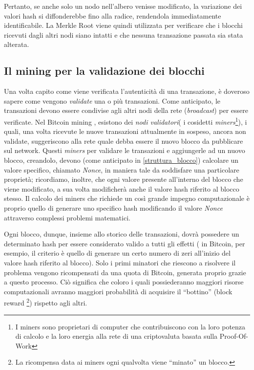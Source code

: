 Pertanto, se anche solo un nodo nell'albero venisse modificato, la variazione dei valori hash si diffonderebbe fino alla radice, rendendola immediatamente identificabile. La Merkle Root viene quindi utilizzata per verificare che i blocchi ricevuti dagli altri nodi siano intatti e che nessuna transazione passata sia stata alterata.


\subsection{Il mining per la validazione dei blocchi}\label{mining}
Una volta capito come viene verificata l'autenticità di una transazione, è doveroso sapere come vengono \textit{validate} una o più transazioni. Come anticipato, le transazioni devono essere condivise agli altri nodi della rete (\textit{broadcast}) per essere verificate.
Nel Bitcoin mining , esistono dei \textit{nodi validatori}( i cosidetti \textit{miners}\footnote{I miners sono proprietari di computer che contribuiscono con la loro potenza di calcolo e la loro energia alla rete di una criptovaluta basata sulla Proof-Of-Work}), i quali, una volta ricevute le nuove transazioni attualmente in sospeso, ancora non validate, suggeriscono alla rete quale debba essere il nuovo blocco da pubblicare sul network.
Questi \textit{miners} per validare le transazioni e aggiungerle ad un nuovo blocco, creandolo, devono (come anticipato in \ref{struttura_blocco}) calcolare un valore specifico, chiamato \textit{Nonce}, in maniera tale da soddisfare una particolare proprietà; ricordiamo, inoltre, che ogni valore presente all'interno del blocco che viene modificato, a sua volta modificherà anche il valore hash riferito al blocco stesso.
Il calcolo dei miners che richiede un così grande impegno computazionale è proprio quello di generare uno specifico hash modificando il valore \textit{Nonce} attraverso complessi problemi matematici.

Ogni blocco, dunque, insieme allo storico delle transazioni, dovrà possedere un determinato hash per essere considerato valido a tutti gli effetti ( in Bitcoin, per esempio, il criterio è quello di generare un certo numero di zeri all'inizio del valore hash riferito al blocco). 
Solo i primi minatori che riescono a risolvere il problema vengono ricompensati da una quota di Bitcoin, generata proprio grazie a questo processo.
Ciò significa che coloro i quali possiederanno maggiori risorse computazionali avranno maggiori probabilità di acquisire il “bottino” (block reward \footnote{La ricompensa data ai miners ogni qualvolta viene “minato” un blocco.}) rispetto agli altri. 

